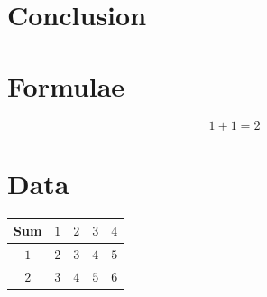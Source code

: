 \documentclass[journal]{IEEEtran}
\begin{document}
\section{Conclusion}


\newpage
\appendices

\section{Formulae}
$$1 + 1 = 2$$

\section{Data}

\begin{table}[H]
  \centering
  \begin{tabular}{c|cccc}
    Sum             & $1$ & $2$ & $3$ & $4$ \\
    \hline
    $1$             & $2$ & $3$ & $4$ & $5$ \\
    $2$             & $3$ & $4$ & $5$ & $6$ \\
  \end{tabular}
\end{table}
\end{document}
